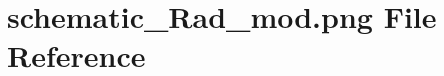 \hypertarget{schematic___rad__mod_8png}{}\section{schematic\+\_\+\+Rad\+\_\+mod.\+png File Reference}
\label{schematic___rad__mod_8png}
